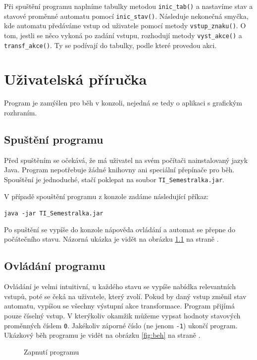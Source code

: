 \documentclass[12pt]{report}
\newcommand\indentt[1]{						
	\setlength\parindent{5mm}
	#1
	\setlength\parindent{0mm}
}												%
\begin{document}
	Při spuštění programu naplníme tabulky metodou \texttt{inic\_tab()} a nastavíme stav a stavové proměnné automatu pomocí \texttt{inic\_stav()}. Následuje nekonečná smyčka, kde automatu předáváme vstup od uživatele pomocí metody \texttt{vstup\_znaku()}. O tom, jestli se něco vykoná po zadání vstupu, rozhodují metody \texttt{vyst\_akce()} a \texttt{transf\_akce()}. Ty se podívají do tabulky, podle které provedou akci.
	
	\chapter{Uživatelská příručka}
	Program je zamýšlen pro běh v konzoli, nejedná se tedy o aplikaci s grafickým rozhraním.
	
	\section{Spuštění programu}
	Před spuštěním se očekává, že má uživatel na svém počítači nainstalovaný jazyk Java. Program nepotřebuje žádné knihovny ani speciální přepínače pro běh. Spouštění je jednoduché, stačí poklepat na soubor \texttt{TI\_Semestralka.jar}. 
	
	V případě spouštění programu z konzole zadáme následující příkaz:
	
	\indentt{
		\texttt{java -jar TI\_Semestralka.jar} \keys{\return}
	}
	
	Po spuštění se vypíše do konzole nápověda ovládání a automat se přepne do počátečního stavu. Názorná ukázka je vidět na obrázku \ref{fig:start} na straně \pageref{fig:start}. 
	
	\section{Ovládání programu}
	Ovládání je velmi intuitivní, u každého stavu se vypíše nabídka relevantních vstupů, poté se čeká na uživatele, který zvolí. Pokud by daný vstup změnil stav automatu, vypíšou se všechny výstupní akce transformace. Program přijímá pouze číselný vstup. V kterýkoliv okamžik můžeme vypsat hodnoty stavových proměnných číslem \texttt{0}. Jakékoliv záporné číslo (ne jenom \texttt{-1}) ukončí program. Ukázkový běh programu je vidět na obrázku \ref{fig:beh} na straně \pageref{fig:beh}.

	\begin{figure}
		\centering
		\caption{Zapnutí programu}
		\label{fig:start}
	\end{figure}
\end{document}
